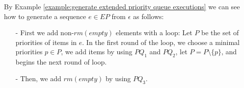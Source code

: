 By Example \ref{example:generate extended priority queue executions} we can see how to generate a sequence $e \in \textit{EP}$ from $\epsilon$ as follows:

\begin{itemize}
\setlength{\itemsep}{0.5pt}
\item[-] First we add non-$\textit{rm}(\textit{empty})$ elements with a loop: Let $P$ be the set of priorities of items in $e$. In the first round of the loop, we choose a minimal priorities $p \in P$, we add items by using $\textit{PQ}_1$ and $\textit{PQ}_2$, let $P = P \setminus \{p\}$, and begins the next round of loop.

\item[-] Then, we add $\textit{rm}(\textit{empty})$ by using $\textit{PQ}_3$.
\end{itemize}
